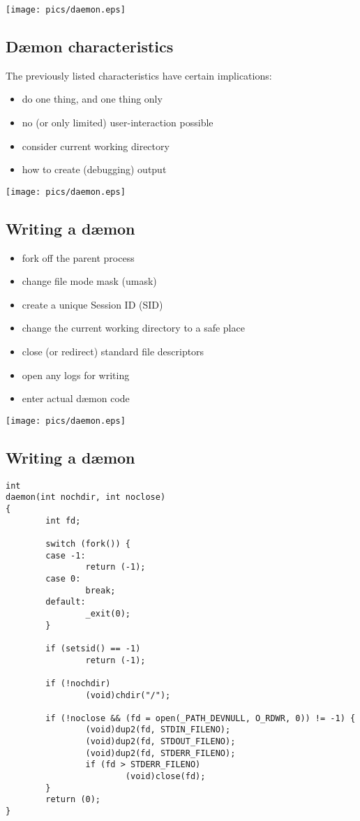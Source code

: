 \documentclass[xga]{xdvislides}
\begin{document}
\vfill
\hfill\texttt{[image: pics/daemon.eps]} \\

\subsection{D\ae mon characteristics}
The previously listed characteristics have certain implications:
\\

\begin{itemize}
	\item do one thing, and one thing only
	\item no (or only limited) user-interaction possible
	\item consider current working directory
	\item how to create (debugging) output
\end{itemize}

\vfill
\hfill\texttt{[image: pics/daemon.eps]} \\

\subsection{Writing a d\ae mon}
\begin{itemize}
	\item fork off the parent process
	\item change file mode mask (umask)
	\item create a unique Session ID (SID)
	\item change the current working directory to a safe place
	\item close (or redirect) standard file descriptors
	\item open any logs for writing
	\item enter actual d\ae mon code
\end{itemize}

\vfill
\hfill\texttt{[image: pics/daemon.eps]} \\

\subsection{Writing a d\ae mon}
\small
\begin{verbatim}
int
daemon(int nochdir, int noclose)
{
        int fd;

        switch (fork()) {
        case -1:
                return (-1);
        case 0:
                break;
        default:
                _exit(0);
        }

        if (setsid() == -1)
                return (-1);

        if (!nochdir)
                (void)chdir("/");

        if (!noclose && (fd = open(_PATH_DEVNULL, O_RDWR, 0)) != -1) {
                (void)dup2(fd, STDIN_FILENO);
                (void)dup2(fd, STDOUT_FILENO);
                (void)dup2(fd, STDERR_FILENO);
                if (fd > STDERR_FILENO)
                        (void)close(fd);
        }
        return (0);
}
\end{verbatim}
\Normalsize
\end{document}
